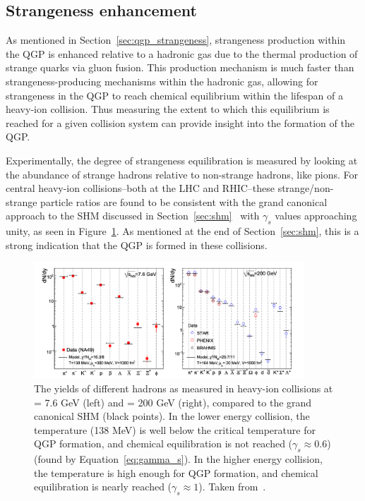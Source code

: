 \subsection{Strangeness enhancement}
\label{sec:strangeness_enhancement}

As mentioned in Section~\ref{sec:qgp_strangeness}, strangeness production within the QGP is enhanced relative to a hadronic gas due to the thermal production of strange quarks via gluon fusion. This production mechanism is much faster than strangeness-producing mechanisms within the hadronic gas, allowing for strangeness in the QGP to reach chemical equilibrium within the lifespan of a heavy-ion collision. Thus measuring the extent to which this equilibrium is reached for a given collision system can provide insight into the formation of the QGP.

 Experimentally, the degree of strangeness equilibration is measured by looking at the abundance of strange hadrons relative to non-strange hadrons, like pions. For central heavy-ion collisions--both at the LHC and RHIC--these strange/non-strange particle ratios are found to be consistent with the grand canonical approach to the SHM discussed in Section~\ref{sec:shm}~\cite{NATURE12, NATURE13} with $\gamma_s$ values approaching unity, as seen in Figure~\ref{fig:macro_model}. As mentioned at the end of Section~\ref{sec:shm}, this is a strong indication that the QGP is formed in these collisions. 
 
    \begin{figure}[ht]
        \centering
        \includegraphics[width=0.9\textwidth]{figures/introduction/macro_model.png}
        \caption{The yields of different hadrons as measured in heavy-ion collisions at \snn = 7.6 GeV (left) and \snn = 200 GeV (right), compared to the grand canonical SHM (black points). In the lower energy collision, the temperature (138 MeV) is well below the critical temperature for QGP formation, and chemical equilibration is not reached ($\gamma_s \approx 0.6$) (found by Equation~\ref{eq:gamma_s}). In the higher energy collision, the temperature is high enough for QGP formation, and chemical equilibration is nearly reached ($\gamma_s \approx 1$). Taken from~\cite{NATURE12}.}
        \label{fig:macro_model}
    \end{figure}

